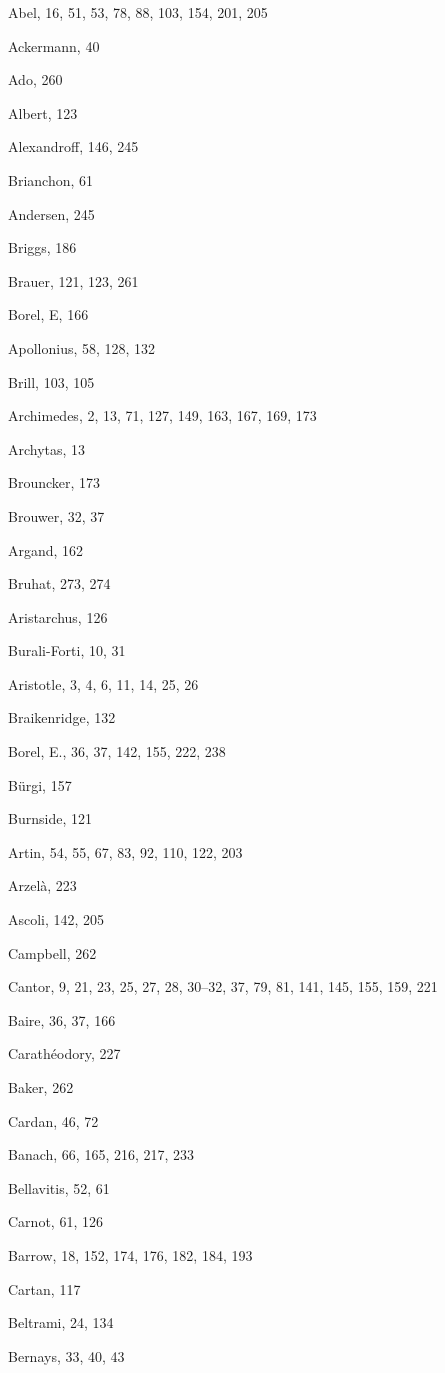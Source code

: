
Abel, 16, 51, 53, 78, 88, 103, 154, 201, 205

Ackermann, 40

Ado, 260

Albert, 123

Alexandroff, 146, 245

Brianchon, 61

Andersen, 245

Briggs, 186

Brauer, 121, 123, 261

Borel, E, 166

Apollonius, 58, 128, 132

Brill, 103, 105

Archimedes, 2, 13, 71, 127, 149, 163, 167, 169, 173

Archytas, 13

Brouncker, 173

Brouwer, 32, 37

Argand, 162

Bruhat, 273, 274

Aristarchus, 126

Burali-Forti, 10, 31

Aristotle, 3, 4, 6, 11, 14, 25, 26

Braikenridge, 132

Borel, E., 36, 37, 142, 155, 222, 238

Bürgi, 157

Burnside, 121

Artin, 54, 55, 67, 83, 92, 110, 122, 203

Arzelà, 223

Ascoli, 142, 205

Campbell, 262

Cantor, 9, 21, 23, 25, 27, 28, 30--32, 37, 79, 81, 141, 145, 155, 159, 221

Baire, 36, 37, 166

Carathéodory, 227

Baker, 262

Cardan, 46, 72

Banach, 66, 165, 216, 217, 233

Bellavitis, 52, 61

Carnot, 61, 126

Barrow, 18, 152, 174, 176, 182, 184, 193

Cartan, 117

Beltrami, 24, 134

Bernays, 33, 40, 43

